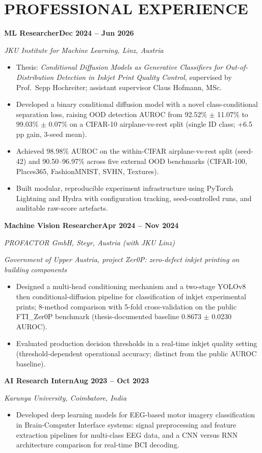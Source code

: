 \documentclass[11pt,a4paper]{article}
\newcommand{\role}[2]{%
  \noindent\textbf{#1}\hfill\textbf{\color{midgray}#2}\par%
}
\newcommand{\org}[1]{\noindent\textit{#1}\par\vspace{1pt}}
\begin{document}
\section*{PROFESSIONAL EXPERIENCE}

\role{ML Researcher}{Dec 2024 -- Jun 2026}
\org{JKU Institute for Machine Learning, Linz, Austria}
\begin{itemize}
  \item Thesis: \emph{Conditional Diffusion Models as Generative Classifiers for Out-of-Distribution Detection in Inkjet Print Quality Control}, supervised by Prof.\ Sepp Hochreiter; assistant supervisor Claus Hofmann, MSc.
  \item Developed a binary conditional diffusion model with a novel class-conditional separation loss, raising OOD detection AUROC from 92.52\% $\pm$ 11.07\% to 99.03\% $\pm$ 0.07\% on a CIFAR-10 airplane-vs-rest split (single ID class; +6.5 pp gain, 3-seed mean).
  \item Achieved 98.98\% AUROC on the within-CIFAR airplane-vs-rest split (seed-42) and 90.50--96.97\% across five external OOD benchmarks (CIFAR-100, Places365, FashionMNIST, SVHN, Textures).
  \item Built modular, reproducible experiment infrastructure using PyTorch Lightning and Hydra with configuration tracking, seed-controlled runs, and auditable raw-score artefacts.
\end{itemize}
\vspace{1pt}

\role{Machine Vision Researcher}{Apr 2024 -- Nov 2024}
\org{PROFACTOR GmbH, Steyr, Austria (with JKU Linz)}
\textit{\small Government of Upper Austria, project Zer0P: zero-defect inkjet printing on building components}
\begin{itemize}
  \item Designed a multi-head conditioning mechanism and a two-stage YOLOv8 then conditional-diffusion pipeline for classification of inkjet experimental prints; 8-method comparison with 5-fold cross-validation on the public FTI\_Zer0P benchmark (thesis-documented baseline 0.8673 $\pm$ 0.0230 AUROC).
  \item Evaluated production decision thresholds in a real-time inkjet quality setting (threshold-dependent operational accuracy; distinct from the public AUROC baseline).
\end{itemize}
\vspace{1pt}

\role{AI Research Intern}{Aug 2023 -- Oct 2023}
\org{Karunya University, Coimbatore, India}
\begin{itemize}
  \item Developed deep learning models for EEG-based motor imagery classification in Brain-Computer Interface systems: signal preprocessing and feature extraction pipelines for multi-class EEG data, and a CNN versus RNN architecture comparison for real-time BCI decoding.
\end{itemize}
\vspace{1pt}
\end{document}
